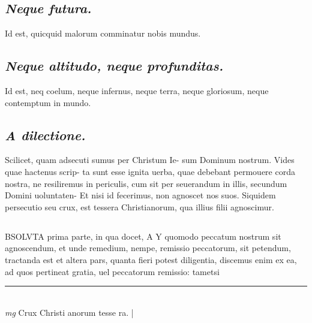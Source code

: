 \documentclass{article}
\begin{document}
\begin{pages}
\subsection*{\textit{Neque futura. }}\pstart Id est, quicquid malorum comminatur nobis mundus.   \pend
{}
{}
\subsection*{\textit{Neque altitudo, neque profunditas. }}\pstart Id est, neq coelum, neque infernus, neque terra, neque gloriosum, neque contemptum in mundo.   \pend
{}
{}
\subsection*{\textit{A dilectione. }}\pstart Scilicet, quam adsecuti sumus per Christum Ie- sum Dominum nostrum. Vides quae hactenus scrip- ta sunt esse ignita uerba, quae debebant permouere corda nostra, ne resiliremus in periculis, cum sit per seuerandum in illis, secundum Domini uoluntaten- Et nisi id fecerimus, non agnoscet nos suos. Siquidem persecutio seu crux, est tessera Christianorum, qua illius filii agnoscimur.   \pend
{}
{}
\subsection*{\textit{}}\pstart BSOLVTA prima parte, in qua docet, A Y quomodo peccatum nostrum sit agnoscendum, et unde remedium, nempe, remissio peccatorum, sit petendum, tractanda est et altera pars, quanta fieri potest diligentia, discemus enim ex ea, ad quos pertineat gratia, uel peccatorum remissio: tametsi  \pend
\vspace{0.5cm}\noindent
\vspace{0.2cm}\rule{1cm}{0.2pt}\\ 
\hspace{0.2cm}\textit{mg}
\footnotesize Crux Christi anorum tesse ra.  
\normalsize| 

\end{pages}
\end{document}

